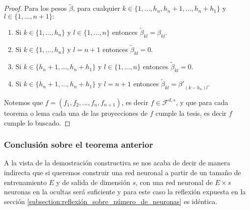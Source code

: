 \begin{proof}
    Para los pesos $\tilde{\beta}$, para cualquier
    $k \in \{1, \ldots , h_n, h_{n} + 1, \ldots, h_n + h_1\}$ y  
    $l \in \{1, \ldots ,  n+1 \} :$ 
    \begin{enumerate}
        \item Si $k \in \{1, \ldots ,  h_n \}$ y $l \in \{1, \ldots , n\}$ 
        entonces $\tilde{\beta}_{k l} = \beta_{k l}.$
        \item Si $k \in \{1, \ldots , h_n \}$ y $l=n+1$ 
        entonces $\tilde{\beta}_{k l} = 0.$
        \item Si $k \in \{h_{n} + 1, \ldots, h_n + h_1 \}$ 
        y $l \in \{1, \ldots , n\}$ 
        entonces $\tilde{\beta}_{k l} = 0.$
        \item Si $k \in \{h_{n} + 1, \ldots, h_n + h_1 \}$ 
        y $l=n+1$ 
        entonces 
        $\tilde{\beta}_{k l} = {\beta '}_{(k- h_n) l}.$
    \end{enumerate}

    Notemos que $f=(f_1, f_2, \ldots, f_n, f_{n+1})$, es decir $f \in \mathcal{F}^{d,s}$, y que para cada teorema o lema
    cada una de las proyecciones de $f$ cumple la tesis, es decir $f$ cumple lo buscado. 
\end{proof}

\subsubsection*{ Conclusión sobre el teorema anterior}  
A la vista de la demostración constructiva se nos acaba de decir de manera indirecta que si queremos construir una red neuronal 
a partir de un tamaño de entrenamiento $E$ y de salida de dimensión $s$, 
con una red neuronal de $E \times s$ neuronas en la ocultas será suficiente y para este caso la reflexión expuesta en la sección \ref{subsection:reflexión_sobre_número_de_neuronas} es idéntica. 



